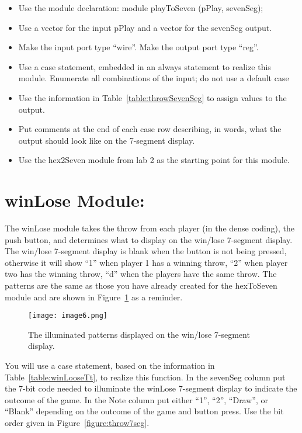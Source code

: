 \begin{itemize}
\item
  Use the module declaration: module playToSeven (pPlay, sevenSeg);
\item
  Use a vector for the input pPlay and a vector for the sevenSeg output.
\item
  Make the input port type ``wire''. Make the output port type ``reg''.
\item
  Use a case statement, embedded in an always statement to realize this
  module. Enumerate all combinations of the input; do not use a default
  case
\item
  Use the information in Table~\ref{table:throwSevenSeg} to assign values to the output.
\item
  Put comments at the end of each case row describing, in words, what
  the output should look like on the 7-segment display.
\item
  Use the hex2Seven module from lab 2 as the starting point for this
  module.
\end{itemize}

\hypertarget{winlose-module}{%
\section{winLose Module:}
\label{winlose-module}}

The winLose module takes the throw from each player (in the dense
coding), the push button, and determines what to display on the win/lose
7-segment display. The win/lose 7-segment display is blank when the
button is not being pressed, otherwise it will show ``1'' when player 1
has a winning throw, ``2'' when player two has the winning throw, ``d''
when the players have the same throw. The patterns are the same as those
you have already created for the hexToSeven module and are shown in
Figure~\ref{fig:winLose7seg} as a reminder.

\begin{figure}[ht]
\texttt{[image:  image6.png]}
\caption{The illuminated patterns displayed on the win/lose 7-segment display.}
\label{fig:winLose7seg}
\end{figure}

You will use a case statement, based on the information in Table~\ref{table:winLooseTt}, to
realize this function. In the sevenSeg column put the 7-bit code needed
to illuminate the winLose 7-segment display to indicate the outcome of
the game. In the Note column put either ``1'', ``2'', ``Draw'', or
``Blank'' depending on the outcome of the game and button press. Use the
bit order given in Figure~\ref{figure:throw7seg}.

